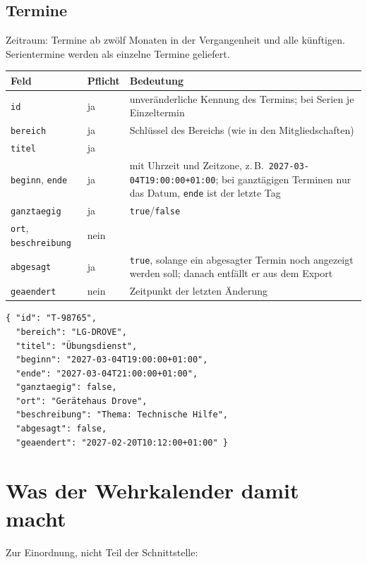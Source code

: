 \documentclass[a4paper,fontsize=10pt]{scrartcl}
\newcommand{\code}[1]{\texttt{#1}}
\begin{document}
\subsection{Termine}

Zeitraum: Termine ab zwölf Monaten in der Vergangenheit und alle künftigen.
Serientermine werden als einzelne Termine geliefert.

\begin{center}
\begin{tabularx}{\textwidth}{L{3.6cm}L{1.6cm}X}
\toprule
\textbf{Feld} & \textbf{Pflicht} & \textbf{Bedeutung} \\
\midrule
\code{id} & ja & unveränderliche Kennung des Termins; bei Serien je
  Einzeltermin \\
\code{bereich} & ja & Schlüssel des Bereichs (wie in den Mitgliedschaften) \\
\code{titel} & ja & \\
\code{beginn}, \code{ende} & ja & mit Uhrzeit und Zeitzone, z.\,B.\
  \code{2027-03-04T19:00:00+01:00}; bei ganztägigen Terminen nur das Datum,
  \code{ende} ist der letzte Tag \\
\code{ganztaegig} & ja & \code{true}/\code{false} \\
\code{ort}, \code{beschreibung} & nein & \\
\code{abgesagt} & ja & \code{true}, solange ein abgesagter Termin noch
  angezeigt werden soll; danach entfällt er aus dem Export \\
\code{geaendert} & nein & Zeitpunkt der letzten Änderung \\
\bottomrule
\end{tabularx}
\end{center}

\begin{lstlisting}
{ "id": "T-98765",
  "bereich": "LG-DROVE",
  "titel": "Übungsdienst",
  "beginn": "2027-03-04T19:00:00+01:00",
  "ende": "2027-03-04T21:00:00+01:00",
  "ganztaegig": false,
  "ort": "Gerätehaus Drove",
  "beschreibung": "Thema: Technische Hilfe",
  "abgesagt": false,
  "geaendert": "2027-02-20T10:12:00+01:00" }
\end{lstlisting}

\section{Was der Wehrkalender damit macht}

Zur Einordnung, nicht Teil der Schnittstelle:
\end{document}
